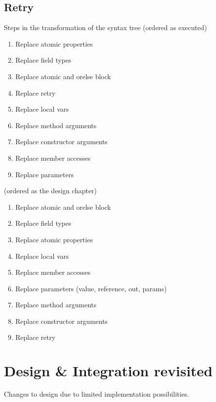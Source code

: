 \subsection{Retry}

Steps in the transformation of the syntax tree (ordered as executed)
\begin{enumerate}
	\item Replace atomic properties
	\item Replace field types
	\item Replace atomic and orelse block
	\item Replace retry
	\item Replace local vars
	\item Replace method arguments
	\item Replace constructor arguments
	\item Replace member accesses
	\item Replace parameters
\end{enumerate}

(ordered as the design chapter)
\begin{enumerate}
	\item Replace atomic and orelse block
	\item Replace field types
	\item Replace atomic properties
	\item Replace local vars
	\item Replace member accesses
	\item Replace parameters (value, reference, out, params)
	\item Replace method arguments
	\item Replace constructor arguments
	\item Replace retry
\end{enumerate}

\section{Design \& Integration revisited}
Changes to design due to limited implementation possibilities.
\worksheetend